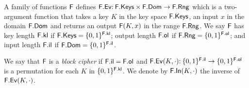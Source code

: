 
A family of functions $\FF$ defines $\Ev{\FF} \Colon \Keys{\FF} \cross \Dom{\FF}\to \Rng{\FF}$ which is a two-argument function that takes a key $K$ in the key space $\Keys{\FF}$, an input $x$ in the domain $\Dom{\FF}$ and returns an output $\FF(K,x)$ in the range $\Rng{\FF}$. We say $\FF$ has key length $\kl{\FF}$ if
$\Keys{\FF}=\bits^{\kl{\FF}}$; output length $\ol{\FF}$ if $\Rng{\FF}=\bits^{\ol{\FF}}$; and input length $\il{\FF}$ if $\Dom{\FF}=\bits^{\il{\FF}}$.

We say that $\FF$ is a \emph{block cipher} if $\il{\FF}=\ol{\FF}$ and $\Ev{\FF}(K,\cdot) \Colon \bits^{\il{\FF}}\to\bits^{\ol{\FF}}$ is a permutation for each $K$ in $\bits^{\kl{\FF}}$. We denote by $\Inv{\FF}(K,\cdot)$ the inverse of $\Ev{\FF}(K,\cdot)$.
